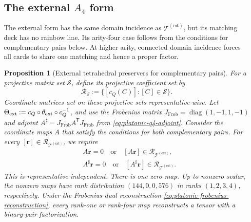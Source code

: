 \documentclass[11pt,letterpaper,onecolumn]{article}
\theoremstyle{plain}
\newtheorem{proposition}[proposition]{Proposition}
\theoremstyle{definition}
\theoremstyle{remark}
\newcommand{\TetInt}{{\mathcal T^{(\mathrm{int})}}}
\newcommand{\TetExt}{{\mathcal T^{(\mathrm{ext})}}}
\newcommand{\diag}{\operatorname{diag}}
\begin{document}
\subsection{The external \texorpdfstring{\(A_4\)}{A4} form}

The external form has the same domain incidence as \(\TetInt\), but
its matching deck has no rainbow line.  Its arity-four case follows from
the conditions for complementary pairs below. At higher arity, connected domain
incidence forces all cards to share one matching and hence a proper factor.

\begin{proposition}[External tetrahedral preservers for complementary pairs]
\label{prop:external-a4-q4-preservers}
For a projective matrix set \(\mathcal S\), define its projective
coefficient set by
\[
\mathcal R_{\mathcal S}
 :=\{[c_Q(C)]:[C]\in\mathcal S\}.
\]
Coordinate matrices act on these projective sets representative-wise.
Let
\(\Theta_{\rm ext}:=c_Q\circ\theta_{\rm ext}\circ c_Q^{-1}\), and use the
Frobenius matrix \(J_{\mathrm{Frob}}=\diag(1,-1,1,-1)\) and adjoint
\(A^\sharp=J_{\mathrm{Frob}}A^{\mathsf T}J_{\mathrm{Frob}}\) from
\cref{eq:platonic-q4-adjoint}. Consider the coordinate maps \(A\) that satisfy the conditions
for both complementary pairs. For every \([{\mathbf r}]\in\mathcal R_{\TetExt}\), we require
\begin{equation}
 \begin{aligned}
  &A{\mathbf{r}}=0\quad\text{or}\quad[A{\mathbf{r}}]\in\mathcal R_{\TetExt},\\
  &A^\sharp {\mathbf{r}}=0\quad\text{or}\quad
    [A^\sharp {\mathbf{r}}]\in\mathcal R_{\TetExt}.
 \end{aligned}
 \label{eq:external-a4-two-sided-definition}
\end{equation}
This is representative-independent.  There is one zero map. Up to nonzero
scalar, the nonzero maps have rank distribution
\((144,0,0,576)\) in ranks \((1,2,3,4)\), respectively.  Under the
Frobenius-dual reconstruction
\cref{eq:platonic-frobenius-reconstruction}, every rank-one or rank-four
map reconstructs a tensor with a binary-pair factorization.
\end{proposition}
\end{document}

